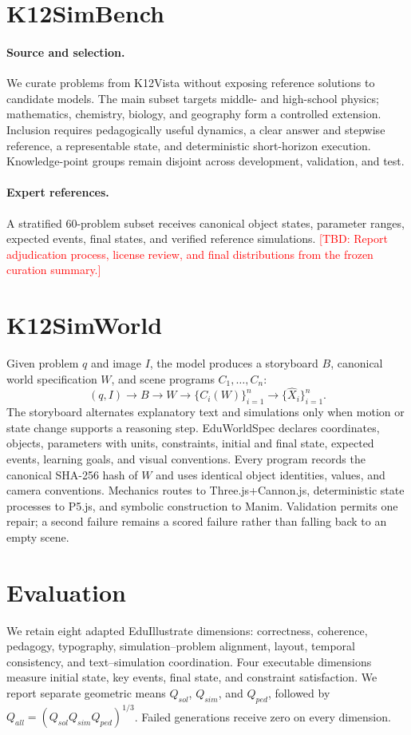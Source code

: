\documentclass[11pt]{article}
\newcommand{\tbd}[1]{\textcolor{red}{[TBD: #1]}}
\begin{document}
\section{K12SimBench}
\paragraph{Source and selection.}
We curate problems from K12Vista without exposing reference solutions to candidate models.
The main subset targets middle- and high-school physics; mathematics, chemistry, biology, and
geography form a controlled extension. Inclusion requires pedagogically useful dynamics, a
clear answer and stepwise reference, a representable state, and deterministic short-horizon
execution. Knowledge-point groups remain disjoint across development, validation, and test.

\paragraph{Expert references.}
A stratified 60-problem subset receives canonical object states, parameter ranges, expected
events, final states, and verified reference simulations. \tbd{Report adjudication process,
license review, and final distributions from the frozen curation summary.}

\section{K12SimWorld}
Given problem $q$ and image $I$, the model produces a storyboard $B$, canonical world
specification $W$, and scene programs $C_1,\ldots,C_n$:
\[
(q,I) \rightarrow B \rightarrow W \rightarrow \{C_i(W)\}_{i=1}^{n}
\rightarrow \{\hat X_i\}_{i=1}^{n}.
\]
The storyboard alternates explanatory text and simulations only when motion or state change
supports a reasoning step. EduWorldSpec declares coordinates, objects, parameters with units,
constraints, initial and final state, expected events, learning goals, and visual conventions.
Every program records the canonical SHA-256 hash of $W$ and uses identical object identities,
values, and camera conventions. Mechanics routes to Three.js+Cannon.js, deterministic state
processes to P5.js, and symbolic construction to Manim. Validation permits one repair; a second
failure remains a scored failure rather than falling back to an empty scene.

\section{Evaluation}
We retain eight adapted EduIllustrate dimensions: correctness, coherence, pedagogy, typography,
simulation--problem alignment, layout, temporal consistency, and text--simulation coordination.
Four executable dimensions measure initial state, key events, final state, and constraint
satisfaction. We report separate geometric means $Q_{sol}$, $Q_{sim}$, and $Q_{ped}$, followed by
$Q_{all}=(Q_{sol}Q_{sim}Q_{ped})^{1/3}$. Failed generations receive zero on every dimension.
\end{document}

